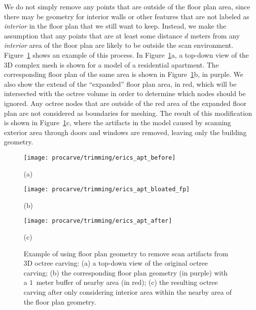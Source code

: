 \documentclass[12pt,onecolumn,oneside]{book}
\begin{document}
We do not simply remove any points that are outside of the floor plan area, since there may be geometry for interior walls or other features that are not labeled as {\it interior} in the floor plan that we still want to keep.  Instead, we make the assumption that any points that are at least some distance $d$ meters from any {\it interior} area of the floor plan are likely to be outside the scan environment.  Figure~\ref{fig:bloated_fp} shows an example of this process.  In Figure~\ref{fig:bloated_fp}a, a top-down view of the 3D complex mesh is shown for a model of a residential apartment.  The corresponding floor plan of the same area is shown in Figure~\ref{fig:bloated_fp}b, in purple.  We also show the extend of the ``expanded'' floor plan area, in red, which will be intersected with the octree volume in order to determine which nodes should be ignored.  Any octree nodes that are outside of the red area of the expanded floor plan are not considered as boundaries for meshing.  The result of this modification is shown in Figure~\ref{fig:bloated_fp}c, where the artifacts in the model caused by scanning exterior area through doors and windows are removed, leaving only the building geometry.

\begin{figure}[t]

	\centering

	\begin{minipage}[t]{0.3\linewidth}
		\centerline{\texttt{[image: procarve/trimming/erics\_apt\_before]}}
		\centerline{(a)}\medskip
	\end{minipage}
	\hfill
	\begin{minipage}[t]{0.3\linewidth}
		\centerline{\texttt{[image: procarve/trimming/erics\_apt\_bloated\_fp]}}
		\centerline{(b)}\medskip
	\end{minipage}
	\hfill
	\begin{minipage}[t]{0.3\linewidth}
		\centerline{\texttt{[image: procarve/trimming/erics\_apt\_after]}}
		\centerline{(c)}\medskip
	\end{minipage}
	
	\caption[Removing artifacts from octree carving with floor plans.]{Example of using floor plan geometry to remove scan artifacts from 3D octree carving:  (a) a top-down view of the original octree carving; (b) the corresponding floor plan geometry (in purple) with a $1$~meter buffer of nearby area (in red); (c) the resulting octree carving after only considering interior area within the nearby area of the floor plan geometry.}
	\label{fig:bloated_fp}

\end{figure}
\end{document}
